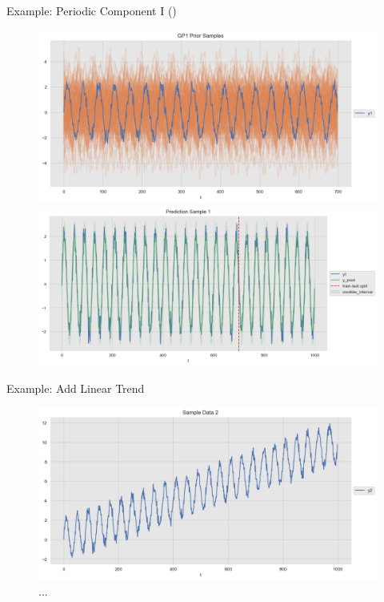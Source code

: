 \documentclass[10pt]{beamer}
\begin{document}
\begin{frame}{Example: Periodic Component I (\cite{gaussian_process_time_series_2019})}{\cite[Section 1.7. Gaussian Processes]{scikitlearn}}
\begin{center}
\begin{figure}
\includegraphics[scale=0.30]{images/gaussian_process_time_series_files/gaussian_process_time_series_22_0.png}
\includegraphics[scale=0.30]{images/gaussian_process_time_series_files/gaussian_process_time_series_28_0.png}
\end{figure}
\end{center}
\end{frame}

\begin{frame}{Example: Add Linear Trend }
\begin{center}
\begin{figure}
\includegraphics[scale=0.4]{images/gaussian_process_time_series_files/gaussian_process_time_series_37_0.png} 
\caption{ ...  }
\end{figure}
\end{center}
\end{frame}
\end{document}
